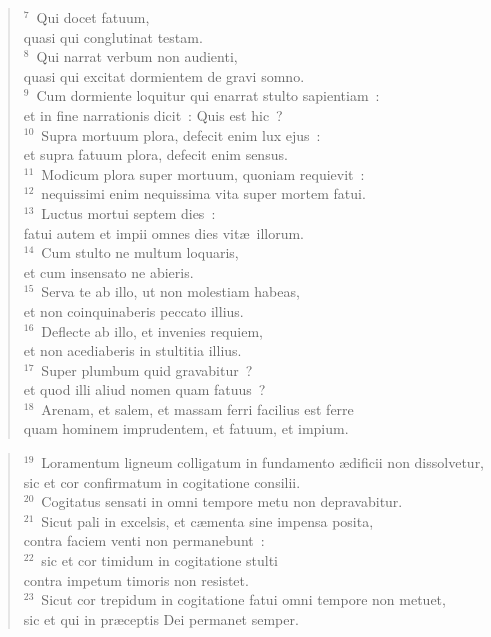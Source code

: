 \begin{verse}${}^{7}$~Qui docet fatuum,\\ quasi qui conglutinat testam.\\
${}^{8}$~Qui narrat verbum non audienti,\\ quasi qui excitat dormientem de gravi somno.\\
${}^{9}$~Cum dormiente loquitur qui enarrat stulto sapientiam~:\\ et in fine narrationis dicit~: Quis est hic~?\\
${}^{10}$~Supra mortuum plora, defecit enim lux ejus~:\\ et supra fatuum plora, defecit enim sensus.\\
${}^{11}$~Modicum plora super mortuum, quoniam requievit~:\\
${}^{12}$~nequissimi enim nequissima vita super mortem fatui.\\
${}^{13}$~Luctus mortui septem dies~:\\ fatui autem et impii omnes dies vit\ae\ illorum.\\
${}^{14}$~Cum stulto ne multum loquaris,\\ et cum insensato ne abieris.\\
${}^{15}$~Serva te ab illo, ut non molestiam habeas,\\ et non coinquinaberis peccato illius.\\
${}^{16}$~Deflecte ab illo, et invenies requiem,\\ et non acediaberis in stultitia illius.\\
${}^{17}$~Super plumbum quid gravabitur~?\\ et quod illi aliud nomen quam fatuus~?\\
${}^{18}$~Arenam, et salem, et massam ferri facilius est ferre\\ quam hominem imprudentem, et fatuum, et impium.\end{verse}


\begin{verse}${}^{19}$~Loramentum ligneum colligatum in fundamento \ae dificii non dissolvetur,\\ sic et cor confirmatum in cogitatione consilii.\\
${}^{20}$~Cogitatus sensati in omni tempore metu non depravabitur.\\
${}^{21}$~Sicut pali in excelsis, et c\ae menta sine impensa posita,\\ contra faciem venti non permanebunt~:\\
${}^{22}$~sic et cor timidum in cogitatione stulti\\ contra impetum timoris non resistet.\\
${}^{23}$~Sicut cor trepidum in cogitatione fatui omni tempore non metuet,\\ sic et qui in pr\ae ceptis Dei permanet semper.\end{verse}


